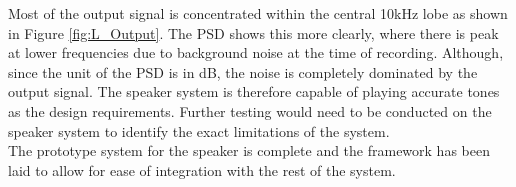 Most of the output signal is concentrated within the central 10kHz lobe as shown in Figure \ref{fig:L_Output}. The PSD shows this more clearly, where there is peak at lower frequencies due to background noise at the time of recording. Although, since the unit of the PSD is in dB, the noise is completely dominated by the output signal. The speaker system is therefore capable of playing accurate tones as the design requirements. Further testing would need to be conducted on the speaker system to identify the exact limitations of the system. \\

The prototype system for the speaker is complete and the framework has been laid to allow for ease of integration with the rest of the system. \\